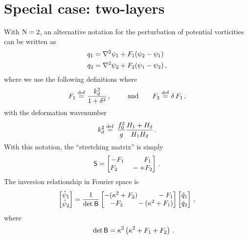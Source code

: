 \documentclass[11pt]{article}
\newcommand{\sS}{\mathsf{S}}
\begin{document}
\section*{Special case: two-layers}
With $\mathrm{N} = 2$, an alternative notation for the perturbation of potential vorticities can be written as
\begin{align}
    q_1 &= \nabla^2 \psi_1 + F_1 (\psi_2 - \psi_1) \nonumber\\
    q_2 &= \nabla^2 \psi_2 + F_2 (\psi_1  - \psi_2)\, ,
\end{align}
where we use the following definitions
where
\begin{equation}
F_1 \stackrel{\mathrm{def}}{=} \frac{k_d^2}{1 + \delta^2}\,, \qquad \:\:\text{and} \qquad F_2 \stackrel{\mathrm{def}}{=} \delta \,F_1\,,
\end{equation}
with the deformation wavenumber
\begin{equation}
k_d^2 \stackrel{\mathrm{def}}{=} \, \frac{f_0^2}{g} \frac{H_1+H_2}{H_1 H_2} \, .
\end{equation}
With this notation, the ``stretching matrix'' is simply
\begin{equation}
\sS = \begin{bmatrix}
- F_1 \qquad \:\:\:\:F_1\\
F_2 \qquad -  + F_2
\end{bmatrix}\per
\end{equation}
The inversion relationship in Fourier space is
\begin{equation}
\begin{bmatrix}
\hat{\psi}_1\\
\hat{\psi}_2\\
\end{bmatrix}
= \frac{1}{\text{det} \: \mathsf{B}}
\begin{bmatrix}
-(\kappa^2 + F_2) \qquad \:\:\:\:-F_1\\
\:\:\:\: -F_2 \qquad - (\kappa^2 + F_1)
\end{bmatrix}
\begin{bmatrix}
\hat{q}_1\\
\hat{q}_2\\
\end{bmatrix}\, ,
\end{equation}
where 
\begin{equation}
\qquad \text{det}\, \mathsf{B} = \kappa^2\left(\kappa^2 + F_1 + F_2\right)\,.
\end{equation}
\end{document}
